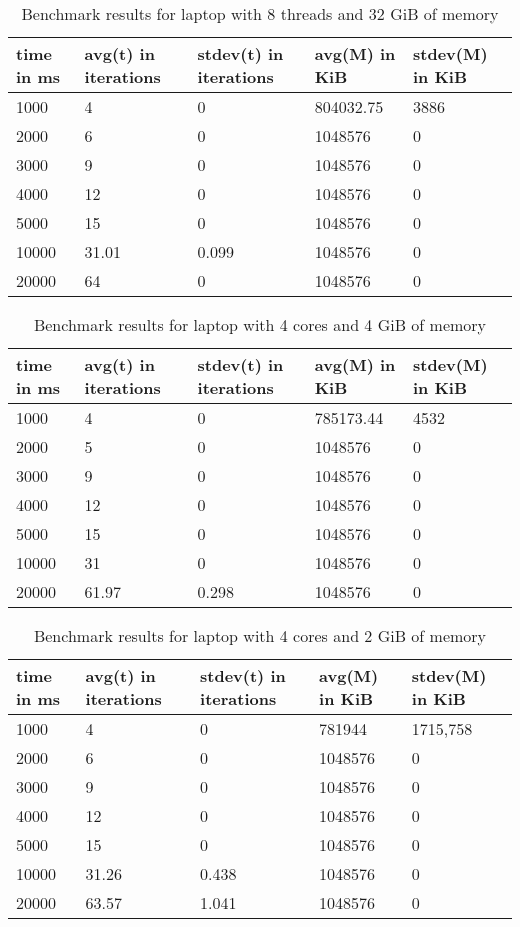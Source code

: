 \documentclass[nolof]{fithesis3}
\begin{document}
\noindent
\begin{table}
\caption{Benchmark results for laptop with 8 threads and 32 GiB of memory}
\label{tab:l8c32g}
\begin{tabularx}{\textwidth}{| X | X | X | X | X |}
\hline
time in ms & avg(t) in iterations & stdev(t) in iterations & avg(M) in KiB & stdev(M) in KiB\\
\hline
1000 & 4 & 0 & 804032.75 & 3886\\
\hline
2000 & 6 & 0 & 1048576 & 0\\
\hline
3000 & 9 & 0 & 1048576 & 0\\
\hline
4000 & 12 & 0 & 1048576 & 0\\
\hline
5000 & 15 & 0 & 1048576 & 0\\
\hline
10000 & 31.01 & 0.099 & 1048576 & 0\\
\hline
20000 & 64 & 0 & 1048576 & 0\\
\hline
\end{tabularx}
\end{table}

\noindent
\begin{table}
\caption{Benchmark results for laptop with 4 cores and 4 GiB of memory}
\label{tab:l4c4g}
\begin{tabularx}{\textwidth}{| X | X | X | X | X |}
\hline
time in ms & avg(t)  in iterations & stdev(t) in iterations & avg(M) in KiB & stdev(M) in KiB\\
\hline
1000 & 4 & 0 & 785173.44 & 4532\\
\hline
2000 & 5 & 0 & 1048576 & 0\\
\hline
3000 & 9 & 0 & 1048576 & 0\\
\hline
4000 & 12 & 0 & 1048576 & 0\\
\hline
5000 & 15 & 0 & 1048576 & 0\\
\hline
10000 & 31 & 0 & 1048576 & 0\\
\hline
20000 & 61.97 & 0.298 & 1048576 & 0\\
\hline
\end{tabularx}
\end{table}

\noindent
\begin{table}
\caption{Benchmark results for laptop with 4 cores and 2 GiB of memory}
\label{tab:l4c2g}
\begin{tabularx}{\textwidth}{| X | X | X | X | X |}
\hline
time in ms & avg(t)  in iterations & stdev(t) in iterations & avg(M) in KiB & stdev(M) in KiB\\
\hline
1000 & 4 & 0 & 781944 & 1715,758\\
\hline
2000 & 6 & 0 & 1048576 & 0\\
\hline
3000 & 9 & 0 & 1048576 & 0\\
\hline
4000 & 12 & 0 & 1048576 & 0\\
\hline
5000 & 15 & 0 & 1048576 & 0\\
\hline
10000 & 31.26 & 0.438 & 1048576 & 0\\
\hline
20000 & 63.57 & 1.041 & 1048576 & 0\\
\hline
\end{tabularx}
\end{table}
\end{document}
